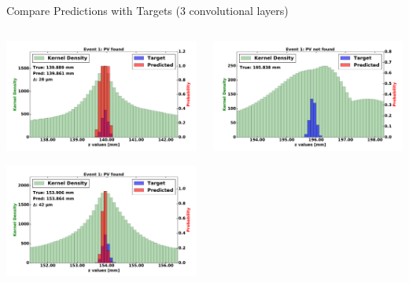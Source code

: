 \begin{frame}{Compare Predictions with Targets (3 convolutional layers)}
  \begin{columns}[c]
        \begin{center}
            \includegraphics[width=1\textwidth,height=0.45\textwidth, trim=18 0 18 0]{images/120000_3layer_08.pdf}
    
            \includegraphics[width=1\textwidth, height=0.45\textwidth,trim=18 0 18 0]{images/120000_3layer_09.pdf}

        \end{center}
        \begin{center}
           \includegraphics[width=1\textwidth, height=0.45\textwidth, trim=18 0 18 0]{images/120000_3layer_10.pdf}
    

\end{center}
\end{columns}
\end{frame}
